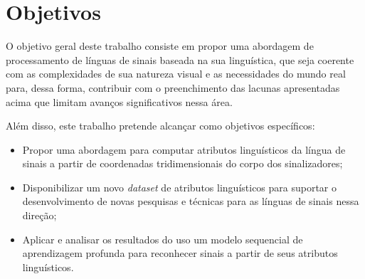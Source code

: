 \section{Objetivos}
\label{sec:introducao-objetivos}

O objetivo geral deste trabalho consiste em propor uma abordagem de processamento de línguas de sinais baseada na sua linguística, que seja coerente com as complexidades de sua natureza visual e as necessidades do mundo real para, dessa forma, contribuir com o preenchimento das lacunas apresentadas acima que limitam avanços significativos nessa área.


Além disso, este trabalho pretende alcançar como objetivos específicos:

\begin{itemize}
    \item Propor uma abordagem para computar atributos linguísticos da língua de sinais a partir de coordenadas tridimensionais do corpo dos sinalizadores;
    \item Disponibilizar um novo \textit{dataset} de atributos linguísticos para suportar o desenvolvimento de novas pesquisas e técnicas para as línguas de sinais nessa direção;
    \item Aplicar e analisar os resultados do uso um modelo sequencial de aprendizagem profunda para reconhecer sinais a partir de seus atributos linguísticos.
\end{itemize}


    

